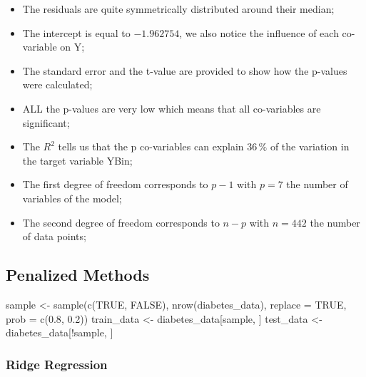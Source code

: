 \documentclass[
]{article}
\newenvironment{Shaded}{\begin{snugshade}}{\end{snugshade}}
\newcommand{\AttributeTok}[1]{\textcolor[rgb]{0.77,0.63,0.00}{#1}}
\newcommand{\ConstantTok}[1]{\textcolor[rgb]{0.00,0.00,0.00}{#1}}
\newcommand{\FloatTok}[1]{\textcolor[rgb]{0.00,0.00,0.81}{#1}}
\newcommand{\FunctionTok}[1]{\textcolor[rgb]{0.00,0.00,0.00}{#1}}
\newcommand{\NormalTok}[1]{#1}
\newcommand{\OtherTok}[1]{\textcolor[rgb]{0.56,0.35,0.01}{#1}}
\newcommand{\SpecialCharTok}[1]{\textcolor[rgb]{0.00,0.00,0.00}{#1}}
\providecommand{\tightlist}{%
  \setlength{\itemsep}{0pt}\setlength{\parskip}{0pt}}
\begin{document}
\begin{itemize}
\tightlist
\item
  The residuals are quite symmetrically distributed around their median;
\item
  The intercept is equal to \(-1.962754\), we also notice the influence
  of each co-variable on Y;
\item
  The standard error and the t-value are provided to show how the
  p-values were calculated;
\item
  ALL the p-values are very low which means that all co-variables are
  significant;
\item
  The \(R^2\) tells us that the p co-variables can explain \(36\,\%\) of
  the variation in the target variable YBin;
\item
  The first degree of freedom corresponds to \(p - 1\) with \(p = 7\)
  the number of variables of the model;
\item
  The second degree of freedom corresponds to \(n - p\) with \(n = 442\)
  the number of data points;
\end{itemize}

\hypertarget{penalized-methods}{%
\subsection{Penalized Methods}\label{penalized-methods}}

\begin{Shaded}
\begin{Highlighting}[]
\NormalTok{sample }\OtherTok{\textless{}{-}} \FunctionTok{sample}\NormalTok{(}\FunctionTok{c}\NormalTok{(}\ConstantTok{TRUE}\NormalTok{, }\ConstantTok{FALSE}\NormalTok{), }\FunctionTok{nrow}\NormalTok{(diabetes\_data), }\AttributeTok{replace =} \ConstantTok{TRUE}\NormalTok{, }\AttributeTok{prob =} \FunctionTok{c}\NormalTok{(}\FloatTok{0.8}\NormalTok{, }\FloatTok{0.2}\NormalTok{))}
\NormalTok{train\_data }\OtherTok{\textless{}{-}}\NormalTok{ diabetes\_data[sample, ]}
\NormalTok{test\_data }\OtherTok{\textless{}{-}}\NormalTok{ diabetes\_data[}\SpecialCharTok{!}\NormalTok{sample, ]}
\end{Highlighting}
\end{Shaded}

\hypertarget{ridge-regression}{%
\subsubsection{Ridge Regression}\label{ridge-regression}}
\end{document}
